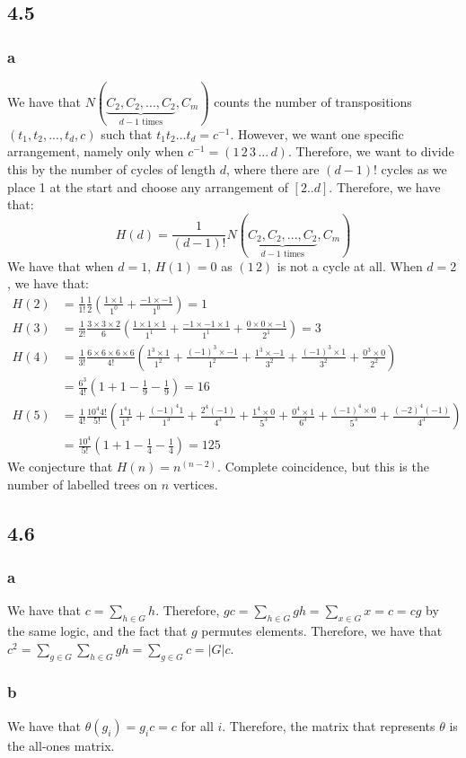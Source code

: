 \documentclass[]{article}
\begin{document}
\subsection*{4.5}
\subsubsection*{a}
We have that $N(\underbrace{C_2, C_2, ..., C_2}_{d-1 \text{ times}}, C_m)$ counts the number of transpositions $(t_1, t_2, ..., t_d, c)$ such that $t_1t_2...t_d = c^{-1}$. However, we want one specific arrangement, namely only when $c^{-1} = (1 \, 2 \, 3 \, ... \, d)$. Therefore, we want to divide this by the number of cycles of length $d$, where there are $(d-1)!$ cycles as we place 1 at the start and choose any arrangement of $[2..d]$. Therefore, we have that:
\begin{equation}
	H(d) = \frac{1}{(d-1)!}N(\underbrace{C_2, C_2, ..., C_2}_{d-1 \text{ times}}, C_m)
\end{equation}
We have that when $d = 1$, $H(1) = 0$ as $(1 \, 2)$ is not a cycle at all.
When $d = 2$, we have that:
\begin{align*}
	H(2) &= \frac{1}{1!}\frac{1}{2} \left(\frac{1 \times 1}{1^0} + \frac{-1 \times -1}{1^0} \right) = 1\\
	H(3) &= \frac{1}{2!} \frac{3 \times 3 \times 2}{6} \left( \frac{1 \times 1 \times 1}{1^1} + \frac{-1 \times -1 \times 1}{1^1} + \frac{0 \times 0 \times -1}{2^1} \right) = 3\\
	H(4) &= \frac{1}{3!} \frac{6 \times 6 \times 6 \times 6}{4!} \left(\frac{1^3 \times 1}{1^2} + \frac{(-1)^3 \times -1}{1^2} + \frac{1^3 \times -1}{3^2} + \frac{(-1)^3 \times 1}{3^2} + \frac{0^3 \times 0}{2^2} \right)\\
	&= \frac{6^3}{4!}\left(1 + 1 - \frac{1}{9} - \frac{1}{9}\right)
	= 16\\
	H(5) &= \frac{1}{4!} \frac{10^4 4!}{5!} \left(\frac{1^4 1}{1^3} + \frac{(-1)^4 1}{1^3} + \frac{2^4 (-1)}{4^3} + \frac{1^4 \times 0}{5^3} + \frac{0^4\times 1}{6^3} + \frac{(-1)^4 \times 0}{5^3} + \frac{(-2)^4 (-1)}{4^3}\right)\\
	&=\frac{10^4}{5!}(1 + 1 -\frac{1}{4} - \frac{1}{4})
	= 125
\end{align*}
We conjecture that $H(n) = n^{(n-2)}$. Complete coincidence, but this is the number of labelled trees on $n$ vertices. 

\subsection*{4.6}
\subsubsection*{a}
We have that $c = \sum_{h \in G} h$. Therefore, $gc = \sum_{h \in G} gh = \sum_{x \in G} x = c = cg$ by the same logic, and the fact that $g$ permutes elements. Therefore, we have that $c^2 = \sum_{g \in G} \sum_{h \in G} gh = \sum_{g \in G} c = |G| c$. 
\subsubsection*{b}
We have that $\theta(g_i) = g_i c = c$ for all $i$. Therefore, the matrix that represents $\theta$ is the all-ones matrix. 
 
\end{document}
